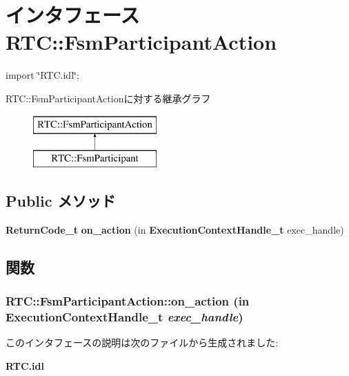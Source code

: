 \section{インタフェース RTC::FsmParticipantAction}
\label{interfaceRTC_1_1FsmParticipantAction}


{\ttfamily import \char`\"{}RTC.idl\char`\"{};}

RTC::FsmParticipantActionに対する継承グラフ\begin{figure}[H]
\begin{center}
\leavevmode
\includegraphics[height=2cm]{interfaceRTC_1_1FsmParticipantAction}
\end{center}
\end{figure}
\subsection*{Public メソッド}
\begin{DoxyCompactItemize}
\item 
{\bf ReturnCode\_\-t} {\bf on\_\-action} (in {\bf ExecutionContextHandle\_\-t} exec\_\-handle)
\end{DoxyCompactItemize}


\subsection{関数}
\subsubsection[{on\_\-action}]{ RTC::FsmParticipantAction::on\_\-action (in {\bf ExecutionContextHandle\_\-t} {\em exec\_\-handle})}\label{interfaceRTC_1_1FsmParticipantAction_ae627f5cdc59f586246bb2174797c7864}


このインタフェースの説明は次のファイルから生成されました:\begin{DoxyCompactItemize}
\item 
{\bf RTC.idl}\end{DoxyCompactItemize}
